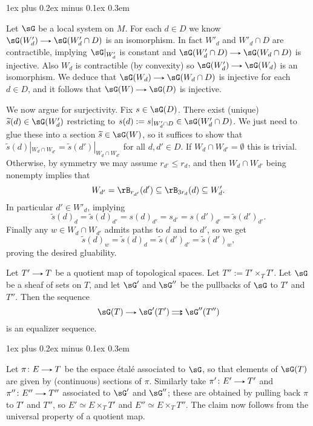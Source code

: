 \documentclass[11pt,leqno]{article}
\makeatletter
\newcommand{\thmheadfont}{\scshape}
\newcommand{\thmhorizspace}{0.3em}
\newcommand{\thmsep}{\hspace{\thmhorizspace}---}
\renewenvironment{proof}[1][Proof]{\par
  \pushQED{\qed}%
  \normalfont%
  \topsep1ex plus 0.2ex minus 0.1ex\relax%
  \labelsep \thmhorizspace\relax%
  \trivlist
  \item[\hskip\labelsep\thmheadfont#1\@addpunct{\thmsep}]\ignorespaces
}{%
  \popQED\endtrivlist\@endpefalse%
}
\theoremstyle{block}
\numberwithin{subblock}{block}
\numberwithin{equation}{subblock}
\newcommand{\arrlen}{1.25em}
\renewcommand{\to}{\mathrel{\tikz[baseline]%
    \draw[>=stealth,->](0,0.5ex)--(\arrlen,0.5ex);}}
\newcommand{\doubto}{\mathrel{%
  \begin{tikzpicture}[baseline]%
    \draw[>=stealth,->](0,0.15ex)--(\arrlen,0.15ex);%
    \draw[>=stealth,->](0,0.85ex)--(\arrlen,0.85ex);%
  \end{tikzpicture}}}
\newcommand{\til}{\widetilde}
\renewcommand{\c}{\colon}
\newcommand{\ce}{\mathrel{:=}}%
\newcommand{\iso}{\simeq}
\numberwithin{block}{section}
\makeatother
\begin{document}
\begin{nothing}
\begin{sublemma}
\begin{proof}
      Let $\sG$ be a local system on $M$. For each $d \in D$ we know $\sG(W'_d) \to \sG(W'_d \cap D)$ is an isomorphism. In fact $W'_d$ and $W'_d \cap D$ are contractible, implying $\sG|_{W'_d}$ is constant and $\sG(W'_d \cap D) \to \sG(W_d \cap D)$ is injective. Also $W_d$ is contractible (by convexity) so $\sG(W'_d) \to \sG(W_d)$ is an isomorphism. We deduce that $\sG(W_d) \to \sG(W_d \cap D)$ is injective for each $d \in D$, and it follows that $\sG(W) \to \sG(D)$ is injective.

      We now argue for surjectivity. Fix $s \in \sG(D)$. There exist (unique) $\til{s}(d) \in \sG(W'_d)$ restricting to $s(d) \ce s|_{W'_d \cap D} \in \sG(W'_d \cap D)$. We just need to glue these into a section $\til{s} \in \sG(W)$, so it suffices to show that $\til{s}(d)|_{W_d \cap W_{d'}} = \til{s}(d')|_{W_d \cap W_{d'}}$ for all $d,d' \in D$. If $W_d \cap W_{d'} = \emptyset$ this is trivial. Otherwise, by symmetry we may assume $r_{d'} \le r_d$, and then $W_d \cap W_{d'}$ being nonempty implies that
      \[
        W_{d'} = \rB_{r_{d'}}(d') \subseteq \rB_{3r_d}(d) \subseteq W'_d.
      \]
      In particular $d' \in W'_d$, implying
      \[
        \til{s}(d)_d = \til{s}(d)_{d'} = s(d)_{d'} = s_{d'} = s(d')_{d'} = \til{s}(d')_{d'}.
      \]
      Finally any $w \in W_d \cap W_{d'}$ admits paths to $d$ and to $d'$, so we get
      \[
        \til{s}(d)_w = \til{s}(d)_d = \til{s}(d')_{d'} = \til{s}(d')_w,
      \]
      proving the desired gluability.
    \end{proof}
  \end{sublemma}

  \begin{sublemma}
    \label{an-proof-espace}
    Let $T' \to T$ be a quotient map of topological spaces. Let $T'' \ce T' \times_T T'$. Let $\sG$ be a sheaf of sets on $T$, and let $\sG'$ and $\sG''$ be the pullbacks of $\sG$ to $T'$ and $T''$. Then the sequence
    \[
      \sG(T) \to \sG'(T') \doubto \sG''(T'')
    \]
    is an equalizer sequence.

    \begin{proof}
      Let $\pi \c E \to T$ be the espace \'etal\'e associated to $\sG$, so that elements of $\sG(T)$ are given by (continuous) sections of $\pi$. Similarly take $\pi' \c E' \to T'$ and $\pi'' \c E'' \to T''$ associated to $\sG'$ and $\sG''$; these are obtained by pulling back $\pi$ to $T'$ and $T''$, so $E' \iso E \times_T T'$ and $E'' \iso E \times_T T''$. The claim now follows from the universal property of a quotient map.
    \end{proof}
  \end{sublemma}
  

\end{nothing}
\end{document}
